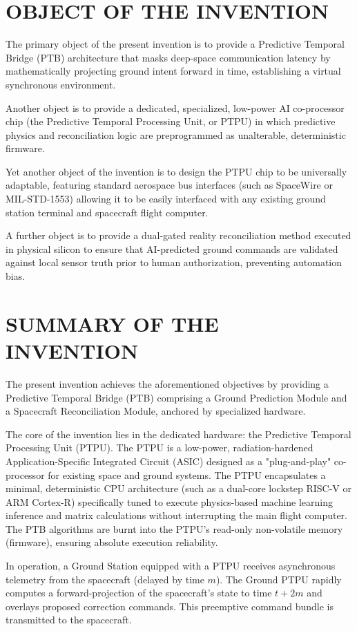 \documentclass[12pt,a4paper]{article}
\begin{document}
\section*{OBJECT OF THE INVENTION}
The primary object of the present invention is to provide a Predictive Temporal Bridge (PTB) architecture that masks deep-space communication latency by mathematically projecting ground intent forward in time, establishing a virtual synchronous environment.

Another object is to provide a dedicated, specialized, low-power AI co-processor chip (the Predictive Temporal Processing Unit, or PTPU) in which predictive physics and reconciliation logic are preprogrammed as unalterable, deterministic firmware.

Yet another object of the invention is to design the PTPU chip to be universally adaptable, featuring standard aerospace bus interfaces (such as SpaceWire or MIL-STD-1553) allowing it to be easily interfaced with any existing ground station terminal and spacecraft flight computer.

A further object is to provide a dual-gated reality reconciliation method executed in physical silicon to ensure that AI-predicted ground commands are validated against local sensor truth prior to human authorization, preventing automation bias.

\section*{SUMMARY OF THE INVENTION}
The present invention achieves the aforementioned objectives by providing a Predictive Temporal Bridge (PTB) comprising a Ground Prediction Module and a Spacecraft Reconciliation Module, anchored by specialized hardware. 

The core of the invention lies in the dedicated hardware: the Predictive Temporal Processing Unit (PTPU). The PTPU is a low-power, radiation-hardened Application-Specific Integrated Circuit (ASIC) designed as a "plug-and-play" co-processor for existing space and ground systems. The PTPU encapsulates a minimal, deterministic CPU architecture (such as a dual-core lockstep RISC-V or ARM Cortex-R) specifically tuned to execute physics-based machine learning inference and matrix calculations without interrupting the main flight computer. The PTB algorithms are burnt into the PTPU's read-only non-volatile memory (firmware), ensuring absolute execution reliability.

In operation, a Ground Station equipped with a PTPU receives asynchronous telemetry from the spacecraft (delayed by time $m$). The Ground PTPU rapidly computes a forward-projection of the spacecraft's state to time $t+2m$ and overlays proposed correction commands. This preemptive command bundle is transmitted to the spacecraft. 
\end{document}
